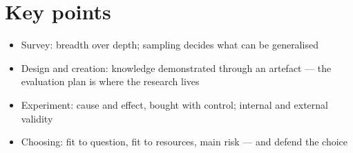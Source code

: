 \documentclass[11pt,a4paper,british,twoside=false,headings=small,chapterprefix=false,numbers=noenddot]{scrbook}
\begin{document}
\section*{Key points}
\begin{itemize}
  \item Survey: breadth over depth; sampling decides what can be generalised
  \item Design and creation: knowledge demonstrated through an artefact --- the evaluation plan is where the research lives
  \item Experiment: cause and effect, bought with control; internal and external validity
  \item Choosing: fit to question, fit to resources, main risk --- and defend the choice
\end{itemize}
\end{document}
